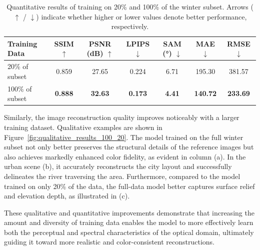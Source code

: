 \begin{table}[h!]
    \centering
    \caption[Quantitative results for different training data scales: 20\% \& 100\%]{Quantitative results of training on 20\% and 100\% of the winter subset. Arrows ($\uparrow$ / $\downarrow$) indicate whether higher or lower values denote better performance, respectively.}
    \begin{tabular}{lcccccc}
        \toprule
        \textbf{Training Data} & \textbf{SSIM $\uparrow$} & \textbf{PSNR (dB) $\uparrow$} & \textbf{LPIPS $\downarrow$} & \textbf{SAM (°) $\downarrow$} & \textbf{MAE $\downarrow$} & \textbf{RMSE $\downarrow$} \\
        \midrule
        20\% of subset         & 0.859                    & 27.65                         & 0.224                       & 6.71                          & 195.30                    & 381.57                     \\
        100\% of subset        & \textbf{0.888}           & \textbf{32.63}                & \textbf{0.173}              & \textbf{4.41}                 & \textbf{140.72}           & \textbf{233.69}            \\
        \bottomrule
    \end{tabular}
    \label{tab:quantitative_result_scale}
\end{table} 
Similarly, the image reconstruction quality improves noticeably with a larger training dataset. Qualitative examples are shown in Figure~\ref{fig:qualitative_results_100_20}. The model trained on the full winter subset not only better preserves the structural details of the reference images but also achieves markedly enhanced color fidelity, as evident in column (a). In the urban scene (b), it accurately reconstructs the city layout and successfully delineates the river traversing the area. Furthermore, compared to the model trained on only 20\% of the data, the full-data model better captures surface relief and elevation depth, as illustrated in (c).

These qualitative and quantitative improvements demonstrate that increasing the amount and diversity of training data enables the model to more effectively learn both the perceptual and spectral characteristics of the optical domain, ultimately guiding it toward more realistic and color-consistent reconstructions.

